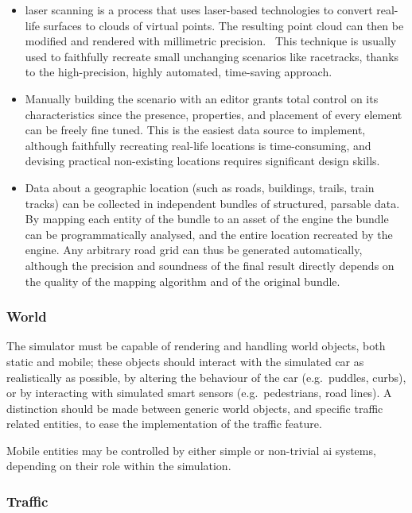 \begin{itemize}
	\item {} laser scanning is a process that uses laser-based technologies to convert real-life surfaces to clouds of virtual points. The resulting  point cloud can then be modified and rendered with millimetric precision.~\cite{feasibility:laserscanning} This technique is usually used to faithfully recreate small unchanging scenarios like racetracks, thanks to the high-precision, highly automated, time-saving approach.
    \item Manually building the scenario with an editor grants total control on its characteristics since the presence, properties, and placement of every element can be freely fine tuned. This is the easiest data source to implement, although faithfully recreating real-life locations is time-consuming, and devising practical non-existing locations requires significant design skills.
    \item Data about a geographic location (such as roads, buildings, trails, train tracks) can be collected in independent bundles of structured, parsable data. By mapping each entity of the bundle to an asset of the engine the bundle can be programmatically analysed, and the entire location recreated by the engine. Any arbitrary road grid can thus be generated automatically, although the precision and soundness of the final result directly depends on the quality of the mapping algorithm and of the original bundle.
\end{itemize}

\subsubsection{World}

The simulator must be capable of rendering and handling world objects, both static and mobile; these objects should interact with the simulated car as realistically as possible, by altering the behaviour of the car (e.g.\ puddles, curbs), or by interacting with simulated smart sensors (e.g.\ pedestrians, road lines). A distinction should be made between generic world objects, and specific traffic related entities, to ease the implementation of the traffic \gls{feature}.

Mobile entities may be controlled by either simple or non-trivial \gls{ai} systems, depending on their role within the simulation.

\subsubsection{Traffic}

